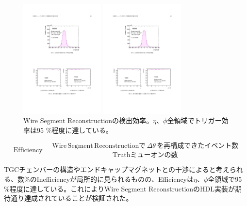 \begin{figure}
    \begin{minipage}[b]{.5\linewidth}
    \centering
    \includegraphics[height=6cm]{fig/Test/Vivado_Wire_eta.pdf}
    \end{minipage}%
    \begin{minipage}[b]{.5\linewidth}
    \centering
    \includegraphics[height=6cm]{fig/Test/Vivado_Wire_phi.pdf}
    \end{minipage}%
    \caption[Wire Segment Reconstructionの検出効率]{Wire Segment Reconstructionの検出効率\cite{mt_nabeyama}。$\eta$、$\phi$全領域でトリガー効率は95 \%程度に達している。}
    \label{Vivado_Wire_Efficiency}
    \end{figure}
    
    \begin{equation}
    \mathrm{Efficiency} = \frac{\mathrm{Wire \,Segment \,Reconstructionで}\,\Delta\theta\,\mathrm{を再構成できたイベント数}}{\mathrm{Truth ミューオン の数}}
\end{equation}

TGCチェンバーの構造やエンドキャップマグネットとの干渉によると考えられる、数\%のInefficiencyが局所的に見られるものの、Efficiencyは$\eta$、$\phi$全領域で95 \%程度に達している。これによりWire Segment ReconstructionのHDL実装が期待通り達成されていることが検証された。

